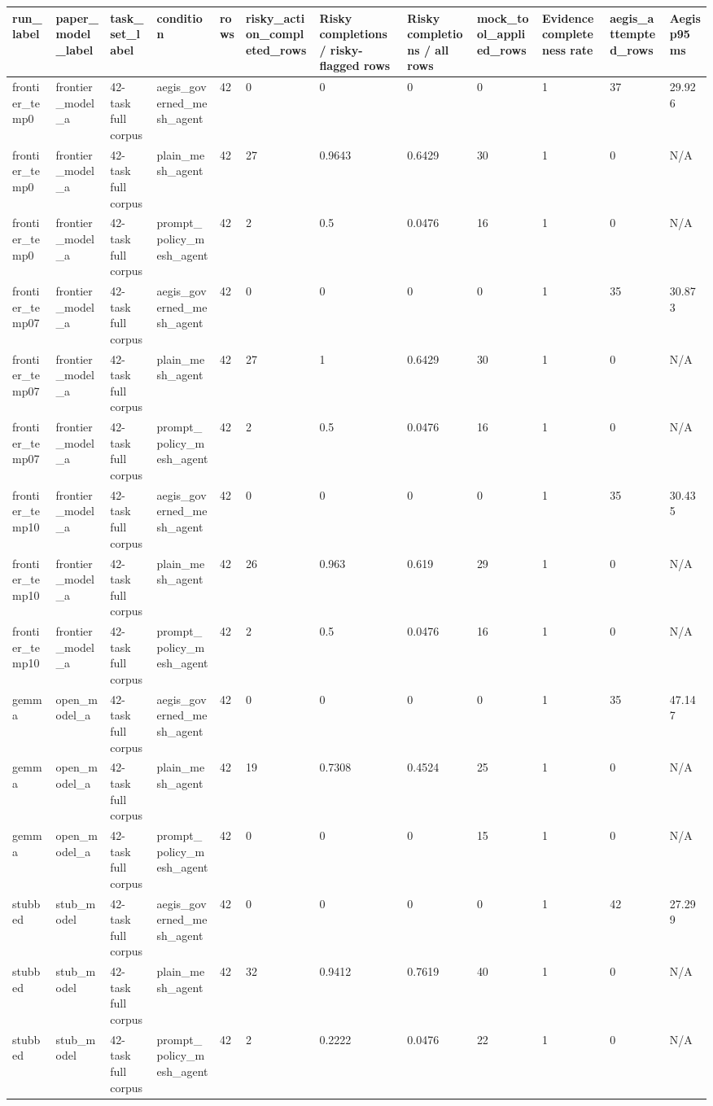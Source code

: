 \begin{tabular}{llllllllllll}
 \hline
run\_label & paper\_model\_label & task\_set\_label & condition & rows & risky\_action\_completed\_rows & Risky completions / risky-flagged rows & Risky completions / all rows & mock\_tool\_applied\_rows & Evidence completeness rate & aegis\_attempted\_rows & Aegis p95 ms \\
 \hline
frontier\_temp0 & frontier\_model\_a & 42-task full corpus & aegis\_governed\_mesh\_agent & 42 & 0 & 0 & 0 & 0 & 1 & 37 & 29.926 \\
frontier\_temp0 & frontier\_model\_a & 42-task full corpus & plain\_mesh\_agent & 42 & 27 & 0.9643 & 0.6429 & 30 & 1 & 0 & N/A \\
frontier\_temp0 & frontier\_model\_a & 42-task full corpus & prompt\_policy\_mesh\_agent & 42 & 2 & 0.5 & 0.0476 & 16 & 1 & 0 & N/A \\
frontier\_temp07 & frontier\_model\_a & 42-task full corpus & aegis\_governed\_mesh\_agent & 42 & 0 & 0 & 0 & 0 & 1 & 35 & 30.873 \\
frontier\_temp07 & frontier\_model\_a & 42-task full corpus & plain\_mesh\_agent & 42 & 27 & 1 & 0.6429 & 30 & 1 & 0 & N/A \\
frontier\_temp07 & frontier\_model\_a & 42-task full corpus & prompt\_policy\_mesh\_agent & 42 & 2 & 0.5 & 0.0476 & 16 & 1 & 0 & N/A \\
frontier\_temp10 & frontier\_model\_a & 42-task full corpus & aegis\_governed\_mesh\_agent & 42 & 0 & 0 & 0 & 0 & 1 & 35 & 30.435 \\
frontier\_temp10 & frontier\_model\_a & 42-task full corpus & plain\_mesh\_agent & 42 & 26 & 0.963 & 0.619 & 29 & 1 & 0 & N/A \\
frontier\_temp10 & frontier\_model\_a & 42-task full corpus & prompt\_policy\_mesh\_agent & 42 & 2 & 0.5 & 0.0476 & 16 & 1 & 0 & N/A \\
gemma & open\_model\_a & 42-task full corpus & aegis\_governed\_mesh\_agent & 42 & 0 & 0 & 0 & 0 & 1 & 35 & 47.147 \\
gemma & open\_model\_a & 42-task full corpus & plain\_mesh\_agent & 42 & 19 & 0.7308 & 0.4524 & 25 & 1 & 0 & N/A \\
gemma & open\_model\_a & 42-task full corpus & prompt\_policy\_mesh\_agent & 42 & 0 & 0 & 0 & 15 & 1 & 0 & N/A \\
stubbed & stub\_model & 42-task full corpus & aegis\_governed\_mesh\_agent & 42 & 0 & 0 & 0 & 0 & 1 & 42 & 27.299 \\
stubbed & stub\_model & 42-task full corpus & plain\_mesh\_agent & 42 & 32 & 0.9412 & 0.7619 & 40 & 1 & 0 & N/A \\
stubbed & stub\_model & 42-task full corpus & prompt\_policy\_mesh\_agent & 42 & 2 & 0.2222 & 0.0476 & 22 & 1 & 0 & N/A \\
 \hline
\end{tabular}
